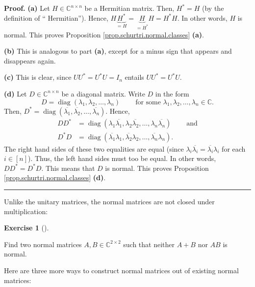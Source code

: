 \documentclass[numbers=enddot,12pt,final,onecolumn,notitlepage]{scrartcl}%
\newcounter{exer}
\numberwithin{exer}{subsection}
\theoremstyle{definition}
\newtheorem{exmp}[exer]{Exercise}
\newenvironment{exercise}[1][]
{\begin{exmp}[#1]\begin{leftbar}}
{\end{leftbar}\end{exmp}}
\newenvironment{proof}[1][Proof]{\noindent\textbf{#1.} }{\ \rule{0.5em}{0.5em}}
\begin{document}
\begin{proof}
\textbf{(a)} Let $H\in\mathbb{C}^{n\times n}$ be a Hermitian matrix. Then,
$H^{\ast}=H$ (by the definition of \textquotedblleft
Hermitian\textquotedblright). Hence, $H\underbrace{H^{\ast}}_{=H}%
=\underbrace{H}_{=H^{\ast}}H=H^{\ast}H$. In other words, $H$ is normal. This
proves Proposition \ref{prop.schurtri.normal.classes} \textbf{(a)}. \medskip

\textbf{(b)} This is analogous to part \textbf{(a)}, except for a minus sign
that appears and disappears again. \medskip

\textbf{(c)} This is clear, since $UU^{\ast}=U^{\ast}U=I_{n}$ entails
$UU^{\ast}=U^{\ast}U$. \medskip

\textbf{(d)} Let $D\in\mathbb{C}^{n\times n}$ be a diagonal matrix. Write $D$
in the form
\[
D=\operatorname*{diag}\left(  \lambda_{1},\lambda_{2},\ldots,\lambda
_{n}\right)  \ \ \ \ \ \ \ \ \ \ \text{for some }\lambda_{1},\lambda
_{2},\ldots,\lambda_{n}\in\mathbb{C}.
\]
Then, $D^{\ast}=\operatorname*{diag}\left(  \overline{\lambda_{1}}%
,\overline{\lambda_{2}},\ldots,\overline{\lambda_{n}}\right)  $. Hence,
\begin{align*}
DD^{\ast}  &  =\operatorname*{diag}\left(  \lambda_{1}\overline{\lambda_{1}%
},\lambda_{2}\overline{\lambda_{2}},\ldots,\lambda_{n}\overline{\lambda_{n}%
}\right)  \ \ \ \ \ \ \ \ \ \ \text{and}\\
D^{\ast}D  &  =\operatorname*{diag}\left(  \overline{\lambda_{1}}\lambda
_{1},\overline{\lambda_{2}}\lambda_{2},\ldots,\overline{\lambda_{n}}%
\lambda_{n}\right)  .
\end{align*}
The right hand sides of these two equalities are equal (since $\lambda
_{i}\overline{\lambda_{i}}=\overline{\lambda_{i}}\lambda_{i}$ for each
$i\in\left[  n\right]  $). Thus, the left hand sides must too be equal. In
other words, $DD^{\ast}=D^{\ast}D$. This means that $D$ is normal. This proves
Proposition \ref{prop.schurtri.normal.classes} \textbf{(d)}.
\end{proof}

Unlike the unitary matrices, the normal matrices are not closed under multiplication:

\begin{exercise}
\label{exe.schurtri.normal.not-additive} Find two normal matrices
$A,B\in\mathbb{C}^{2\times2}$ such that neither $A+B$ nor $AB$ is normal.
\end{exercise}

Here are three more ways to construct normal matrices out of existing normal matrices:
\end{document}
